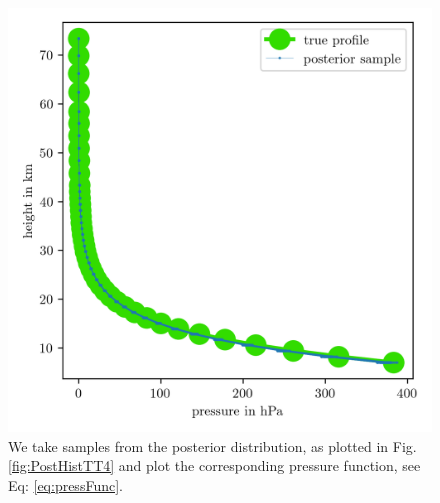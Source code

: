 \begin{figure}[ht!]
	\centering
	\includegraphics{PressPostMeanSigm.png}
	\caption[Pressure posterior samples.]{We take samples from the posterior distribution, as plotted in Fig. \ref{fig:PostHistTT4} and plot the corresponding pressure function, see Eq: \ref{eq:pressFunc}.}
	\label{fig:PressPost}
\end{figure}



